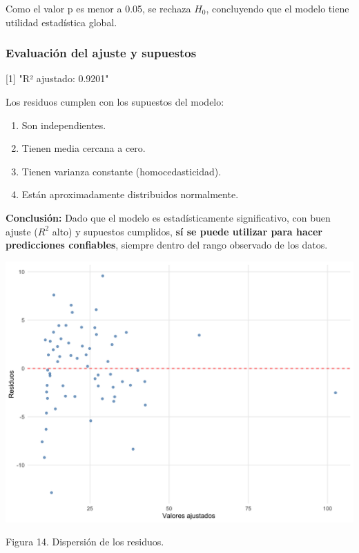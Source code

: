 \documentclass[
]{article}
\begin{document}
\begin{multicols}{2}

Como el valor p es menor a 0.05, se rechaza \( H_0 \), concluyendo que el modelo tiene utilidad estadística global.

\subsubsection{Evaluación del ajuste y supuestos}

[1] "R² ajustado: 0.9201"

Los residuos cumplen con los supuestos del modelo:

\begin{enumerate}
  \item Son independientes.
  \item Tienen media cercana a cero.
  \item Tienen varianza constante (homocedasticidad).
  \item Están aproximadamente distribuidos normalmente.
\end{enumerate}

\textbf{Conclusión:}  
Dado que el modelo es estadísticamente significativo, con buen ajuste (\( R^2 \) alto) y supuestos cumplidos, \textbf{sí se puede utilizar para hacer predicciones confiables}, siempre dentro del rango observado de los datos.





\begin{center}
\includegraphics[width=\linewidth]{modelo_multip_residuos.png}
\end{center}
Figura 14. Dispersión de los residuos.





\end{multicols}
\end{document}
